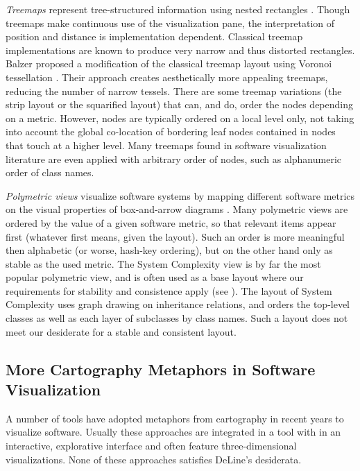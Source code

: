 \emph{Treemaps} represent tree-structured information using nested rectangles \cite{Ware04a}.
Though treemaps make continuous use of the visualization pane, the interpretation of position and distance is implementation dependent. Classical treemap implementations are known to produce very narrow and thus distorted rectangles. Balzer \etal proposed a modification of the classical treemap layout using Voronoi tessellation \cite{Balz05a}. Their approach creates aesthetically more appealing treemaps, reducing the number of narrow tessels. There are some treemap variations (\eg the strip layout or the squarified layout) that can, and do, order the nodes depending on a metric. However, nodes are typically ordered on a local level only, not taking into account the global co-location of bordering leaf nodes contained in nodes that touch at a higher level. Many treemaps found in software visualization literature are even applied with arbitrary order of nodes, such as alphanumeric order of class names. 

\emph{Polymetric views} visualize software systems by mapping different software metrics on the visual properties of box-and-arrow diagrams \cite{Lanz03d,Lanz06a}. Many polymetric views are ordered by the 
value of a given software metric, so that relevant items appear first (whatever first means, given the 
layout). Such an order is more meaningful then alphabetic (or worse, hash-key ordering), but on the other hand only as stable as the used metric. The System Complexity view is by far the most popular polymetric view, and is often used as a base layout where our requirements for stability and consistence apply (see \eg \cite{Gree06a}). The layout of System Complexity uses graph drawing on inheritance relations, and orders the top-level classes as well as each layer of subclasses by class names. Such a layout does not meet our desiderate for a stable and consistent layout.
   
\subsection{ More Cartography Metaphors in Software Visualization}\label{sec:other}

A number of tools have adopted metaphors from cartography in recent years to visualize software.
Usually these approaches are integrated in a tool with in an interactive, explorative interface and often feature three-dimensional visualizations. None of these approaches satisfies DeLine's desiderata.

